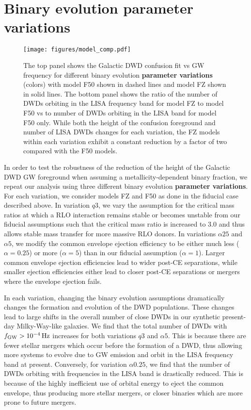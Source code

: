 \documentclass[twocolumn, linenumbers]{aastex631}
\begin{document}
\section{Binary evolution \textbf{parameter variations}}
\label{sec:model_compare}

\begin{figure}
	\texttt{[image: figures/model\_comp.pdf]}
    \caption{The top panel shows the Galactic DWD confusion fit vs GW frequency for different binary evolution \textbf{parameter variations} (colors) with model F50 shown in dashed lines and model FZ shown in solid lines. The bottom panel shows the ratio of the number of DWDs orbiting in the LISA frequency band for model FZ to model F50 vs to number of DWDs orbiting in the LISA band for model F50 only. While both the height of the confusion foreground and number of LISA DWDs changes for each variation, the FZ models within each variation exhibit a constant reduction by a factor of two compared with the F50 models.}
    \label{fig:model_comp}
\end{figure}

In order to test the robustness of the reduction of the height of the Galactic DWD GW foreground when assuming a metallicity-dependent binary fraction, we repeat our analysis using three different binary evolution \textbf{parameter variations}. For each variation, we consider models FZ and F50 as done in the fiducial case described above. In variation $q3$, we vary the assumption for the critical mass ratios at which a RLO interaction remains stable or becomes unstable from our fiducial assumptions such that the critical mass ratio is increased to $3.0$ and thus allows stable mass transfer for more massive RLO donors. In variations $\alpha25$ and $\alpha5$, we modify the common envelope ejection efficiency to be either much less ($\alpha=0.25$) or more ($\alpha=5$) than in our fiducial assumption ($\alpha=1$). Larger common envelope ejection efficiencies lead to wider post-CE separations, while smaller ejection efficiencies either lead to closer post-CE separations or mergers where the envelope ejection fails. 

In each variation, changing the binary evolution assumptions dramatically changes the formation and evolution of the DWD populations. These changes lead to large shifts in the overall number of close DWDs in our synthetic present-day Milky-Way-like galaxies. We find that the total number of DWDs with $f_{\rm{GW}}>10^{-4}\,\rm{Hz}$ increases for both variations $q3$ and $\alpha5$. This is because there are fewer stellar mergers which occur before the formation of a DWD, thus allowing more systems to evolve due to GW emission and orbit in the LISA frequency band at present. Conversely, for variation $\alpha0.25$, we find that the number of DWDs orbiting with frequencies in the LISA band is drastically reduced. This is because of the highly inefficient use of orbital energy to eject the common envelope, thus producing more stellar mergers, or closer binaries which are more prone to future mergers.
\end{document}
